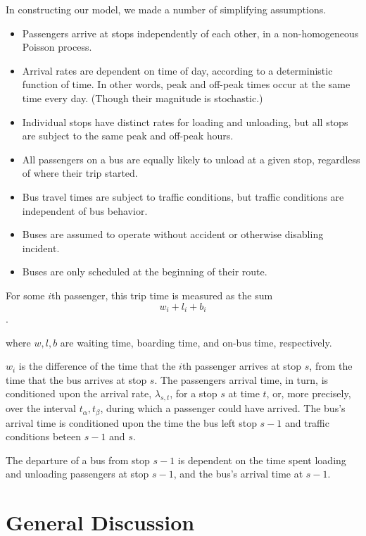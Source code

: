 \documentclass[12pt]{article}
\begin{document}
In constructing our model, we made a number of simplifying assumptions.
\begin{itemize}
    \item Passengers arrive at stops independently of each other, in
        a non-homogeneous Poisson process.
    \item Arrival rates are dependent on time of day, according to a
        deterministic function of time. In other words, peak and off-peak
        times occur at the same time every day. (Though their magnitude is
        stochastic.)
    \item Individual stops have distinct rates for loading and unloading, but
        all stops are subject to the same peak and off-peak hours.
    \item All passengers on a bus are equally likely to unload at a given
        stop, regardless of where their trip started.
    \item Bus travel times are subject to traffic conditions, but traffic
        conditions are independent of bus behavior.
    \item Buses are assumed to operate without accident or otherwise disabling
        incident.
    \item Buses are only scheduled at the beginning of their route.
\end{itemize}

For some $i$th passenger, this trip time is measured as the sum
\[
    w_i + l_i + b_i
\].

where $w, l, b$ are waiting time, boarding time, and on-bus time,
respectively.

$w_i$ is the difference of the time that the $i$th passenger arrives at stop
$s$, from the time that the bus arrives at stop $s$. The passengers arrival
time, in turn, is conditioned upon the arrival rate, $\lambda_{s,t}$, for a
stop $s$ at time $t$, or, more precisely, over the interval $t_\alpha,
t_\beta$, during which a passenger could have arrived. The bus's arrival time
is conditioned upon the time the bus left stop $s-1$ and traffic conditions
beteen $s-1$ and $s$.

The departure of a bus from stop $s-1$ is dependent on the time spent loading
and unloading passengers at stop $s-1$, and the bus's arrival time at $s-1$.

\section{General Discussion}
\end{document}
